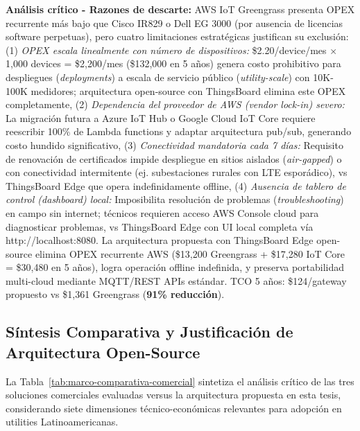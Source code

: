 \textbf{Análisis crítico - Razones de descarte:} AWS IoT Greengrass presenta OPEX recurrente más bajo que Cisco IR829 o Dell EG 3000 (por ausencia de licencias software perpetuas), pero cuatro limitaciones estratégicas justifican su exclusión: (1) \textit{OPEX escala linealmente con número de dispositivos:} \$2.20/device/mes $\times$ 1,000 devices = \$2,200/mes (\$132,000 en 5 años) genera costo prohibitivo para despliegues (\textit{deployments}) a escala de servicio público (\textit{utility-scale}) con 10K-100K medidores; arquitectura open-source con ThingsBoard elimina este OPEX completamente, (2) \textit{Dependencia del proveedor de AWS (\textit{vendor lock-in}) severo:} La migración futura a Azure IoT Hub o Google Cloud IoT Core requiere reescribir 100\% de Lambda functions y adaptar arquitectura pub/sub, generando costo hundido significativo, (3) \textit{Conectividad mandatoria cada 7 días:} Requisito de renovación de certificados impide despliegue en sitios aislados (\textit{air-gapped}) o con conectividad intermitente (ej. subestaciones rurales con LTE esporádico), vs ThingsBoard Edge que opera indefinidamente offline, (4) \textit{Ausencia de tablero de control (\textit{dashboard}) local:} Imposibilita resolución de problemas (\textit{troubleshooting}) en campo sin internet; técnicos requieren acceso AWS Console cloud para diagnosticar problemas, vs ThingsBoard Edge con UI local completa vía http://localhost:8080. La arquitectura propuesta con ThingsBoard Edge open-source elimina OPEX recurrente AWS (\$13,200 Greengrass + \$17,280 IoT Core = \$30,480 en 5 años), logra operación offline indefinida, y preserva portabilidad multi-cloud mediante MQTT/REST APIs estándar. TCO 5 años: \$124/gateway propuesto vs \$1,361 Greengrass (\textbf{91\% reducción}).

\subsection{Síntesis Comparativa y Justificación de Arquitectura Open-Source}
\label{sec:marco-sintesis-comercial}

La Tabla~\ref{tab:marco-comparativa-comercial} sintetiza el análisis crítico de las tres soluciones comerciales evaluadas versus la arquitectura propuesta en esta tesis, considerando siete dimensiones técnico-económicas relevantes para adopción en utilities Latinoamericanas.

